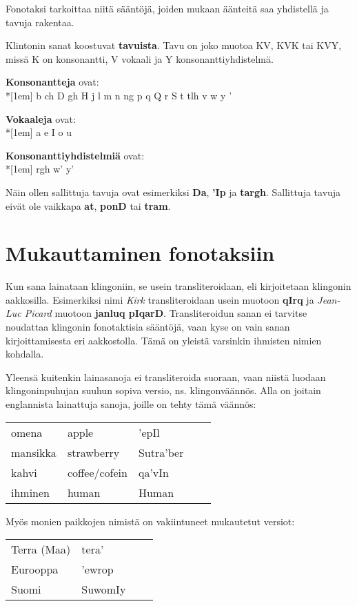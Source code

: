 \documentclass{book}
\begin{document}
Fonotaksi tarkoittaa niitä sääntöjä, joiden mukaan äänteitä saa yhdistellä ja tavuja rakentaa.

Klintonin sanat koostuvat \textbf{tavuista}.
Tavu on joko muotoa KV, KVK tai KVY, missä K on konsonantti, V vokaali ja Y konsonanttiyhdistelmä.

\textbf{Konsonantteja} ovat:\\*[1em]
b ch D gh H j l m n ng p q Q r S t tlh v w y '

\textbf{Vokaaleja} ovat:\\*[1em]
a e I o u

\textbf{Konsonanttiyhdistelmiä} ovat:\\*[1em]
rgh w' y'

Näin ollen sallittuja tavuja ovat esimerkiksi \textbf{Da}, \textbf{'Ip} ja \textbf{targh}. Sallittuja tavuja eivät ole vaikkapa \textbf{at}, \textbf{ponD} tai \textbf{tram}.

\section{Mukauttaminen fonotaksiin}

Kun sana lainataan klingoniin, se usein transliteroidaan, eli kirjoitetaan klingonin aakkosilla. Esimerkiksi nimi \textit{Kirk} transliteroidaan usein muotoon \textbf{qIrq} ja \textit{Jean-Luc Picard} muotoon \textbf{janluq pIqarD}. Transliteroidun sanan ei tarvitse noudattaa klingonin fonotaktisia sääntöjä, vaan kyse on vain sanan kirjoittamisesta eri aakkostolla. Tämä on yleistä varsinkin ihmisten nimien kohdalla.

Yleensä kuitenkin lainasanoja ei transliteroida suoraan, vaan niistä luodaan klingoninpuhujan suuhun sopiva versio, ns. klingonväännös. Alla on joitain englannista lainattuja sanoja, joille on tehty tämä väännös:

\begin{tabular}{l Il Bl}
    omena & apple & 'epIl \\
    mansikka & strawberry & Sutra'ber \\
    kahvi & coffee/cofein & qa'vIn \\
    ihminen & human & Human \\
\end{tabular}

Myös monien paikkojen nimistä on vakiintuneet mukautetut versiot:

\begin{tabular}{Il Bl}
    Terra (Maa) & tera' \\
    Eurooppa & 'ewrop \\
    Suomi & SuwomIy \\
\end{tabular}
\end{document}
